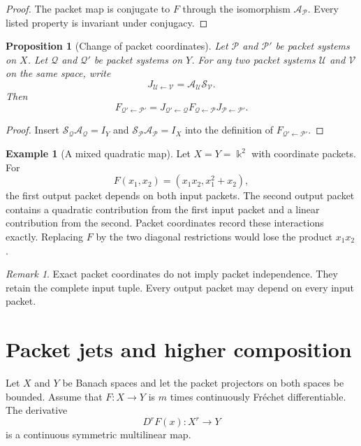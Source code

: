 \documentclass[11pt,a4paper]{article}
\theoremstyle{plain}
\newtheorem{proposition}[proposition]{Proposition}
\theoremstyle{definition}
\newtheorem{example}[example]{Example}
\theoremstyle{remark}
\newtheorem{remark}[remark]{Remark}
\newcommand{\bbk}{\Bbbk}
\newcommand{\Acal}{\mathcal A}
\newcommand{\Pcal}{\mathcal P}
\newcommand{\Qcal}{\mathcal Q}
\newcommand{\Scal}{\mathcal S}
\newcommand{\Ucal}{\mathcal U}
\newcommand{\Vcal}{\mathcal V}
\begin{document}
\begin{proof}
The packet map is conjugate to $F$ through the isomorphism $\Acal_{\Pcal}$.  Every listed property is invariant under conjugacy.
\end{proof}

\begin{proposition}[Change of packet coordinates]\label{prop:change_packet_coordinates}
Let $\Pcal$ and $\Pcal'$ be packet systems on $X$.  Let $\Qcal$ and $\Qcal'$ be packet systems on $Y$.  For any two packet systems $\Ucal$ and $\Vcal$ on the same space, write
\[
J_{\Ucal\leftarrow\Vcal}
=
\Acal_{\Ucal}\Scal_{\Vcal}.
\]
Then
\[
F_{\Qcal'\leftarrow\Pcal'}
=
J_{\Qcal'\leftarrow\Qcal}
F_{\Qcal\leftarrow\Pcal}
J_{\Pcal\leftarrow\Pcal'}.
\]
\end{proposition}

\begin{proof}
Insert $\Scal_{\Qcal}\Acal_{\Qcal}=I_Y$ and $\Scal_{\Pcal}\Acal_{\Pcal}=I_X$ into the definition of $F_{\Qcal'\leftarrow\Pcal'}$.
\end{proof}

\begin{example}[A mixed quadratic map]\label{ex:mixed_quadratic}
Let $X=Y=\bbk^2$ with coordinate packets.  For
\[
F(x_1,x_2)=(x_1x_2,x_1^2+x_2),
\]
the first output packet depends on both input packets.  The second output packet contains a quadratic contribution from the first input packet and a linear contribution from the second.  Packet coordinates record these interactions exactly.  Replacing $F$ by the two diagonal restrictions would lose the product $x_1x_2$.
\end{example}

\begin{remark}\label{rem:coordinates_not_independence}
Exact packet coordinates do not imply packet independence.  They retain the complete input tuple.  Every output packet may depend on every input packet.
\end{remark}

\section{Packet jets and higher composition}\label{sec:packet_jets}

Let $X$ and $Y$ be Banach spaces and let the packet projectors on both spaces be bounded.  Assume that $F:X\to Y$ is $m$ times continuously Fr\'echet differentiable.  The derivative
\[
D^rF(x):X^r\longrightarrow Y
\]
is a continuous symmetric multilinear map.
\end{document}
